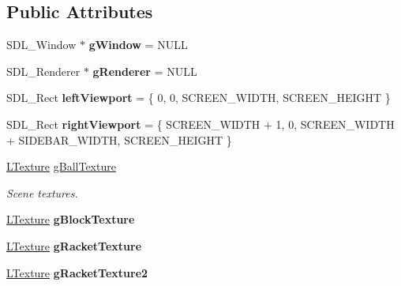 \subsection*{Public Attributes}
\begin{DoxyCompactItemize}
\item 
\mbox{\label{class_render_a56f4679c30a4da025f82f93847d8489a}} 
S\+D\+L\+\_\+\+Window $\ast$ {\bfseries g\+Window} = N\+U\+LL
\item 
\mbox{\label{class_render_afa0976cec27200747482493e6e9ca779}} 
S\+D\+L\+\_\+\+Renderer $\ast$ {\bfseries g\+Renderer} = N\+U\+LL
\item 
\mbox{\label{class_render_af698eaede8e7778ca77187baaaeb8cbe}} 
S\+D\+L\+\_\+\+Rect {\bfseries left\+Viewport} = \{ 0, 0, S\+C\+R\+E\+E\+N\+\_\+\+W\+I\+D\+TH, S\+C\+R\+E\+E\+N\+\_\+\+H\+E\+I\+G\+HT \}
\item 
\mbox{\label{class_render_af4e82c87974121b37bbbcb001cc46a83}} 
S\+D\+L\+\_\+\+Rect {\bfseries right\+Viewport} = \{ S\+C\+R\+E\+E\+N\+\_\+\+W\+I\+D\+TH + 1, 0, S\+C\+R\+E\+E\+N\+\_\+\+W\+I\+D\+TH + S\+I\+D\+E\+B\+A\+R\+\_\+\+W\+I\+D\+TH, S\+C\+R\+E\+E\+N\+\_\+\+H\+E\+I\+G\+HT \}
\item 
\mbox{\label{class_render_a5c144f87e4aa2ef8643a8e2dc139e478}} 
\hyperlink{class_l_texture}{L\+Texture} \hyperlink{class_render_a5c144f87e4aa2ef8643a8e2dc139e478}{g\+Ball\+Texture}
\begin{DoxyCompactList}\small\item\em Scene textures. \end{DoxyCompactList}\item 
\mbox{\label{class_render_aca8afc8957a810bb962ab8f5a31d8500}} 
\hyperlink{class_l_texture}{L\+Texture} {\bfseries g\+Block\+Texture}
\item 
\mbox{\label{class_render_a948ab1b6efa9c18ec8fde021cd745963}} 
\hyperlink{class_l_texture}{L\+Texture} {\bfseries g\+Racket\+Texture}
\item 
\mbox{\label{class_render_a0c4f77794b5dabecf25f84415fb3ad85}} 
\hyperlink{class_l_texture}{L\+Texture} {\bfseries g\+Racket\+Texture2}

\end{DoxyCompactItemize}
